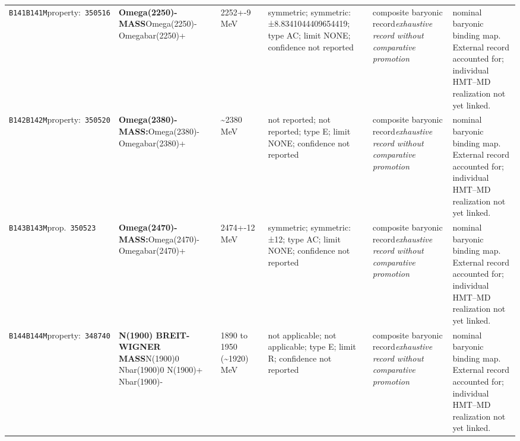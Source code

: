 \begin{landscape}
\begin{longtable}{L{1.85cm}L{4.45cm}L{2.35cm}L{4.05cm}L{3.35cm}L{7.15cm}}
\texttt{B141}\newline \texttt{B141M}\newline property:\ \texttt{350516} & \textbf{Omega(2250)- MASS}\newline Omega(2250)- \textbar{}\allowbreak{} Omegabar(2250)+ & 2252+-9\,MeV & symmetric; symmetric: ±8.8341044409654419; type AC; limit NONE; confidence not reported & composite baryonic record\newline \emph{exhaustive record without comparative promotion} & nominal baryonic binding map. External record accounted for; individual HMT--MD realization not yet linked. \\
\texttt{B142}\newline \texttt{B142M}\newline property:\ \texttt{350520} & \textbf{Omega(2380)- MASS:}\newline Omega(2380)- \textbar{}\allowbreak{} Omegabar(2380)+ & \textasciitilde{}2380\,MeV & not reported; not reported; type E; limit NONE; confidence not reported & composite baryonic record\newline \emph{exhaustive record without comparative promotion} & nominal baryonic binding map. External record accounted for; individual HMT--MD realization not yet linked. \\
\texttt{B143}\newline \texttt{B143M}\newline prop.\ \texttt{350523} & \textbf{Omega(2470)- MASS:}\newline Omega(2470)- \textbar{}\allowbreak{} Omegabar(2470)+ & 2474+-12\,MeV & symmetric; symmetric: ±12; type AC; limit NONE; confidence not reported & composite baryonic record\newline \emph{exhaustive record without comparative promotion} & nominal baryonic binding map. External record accounted for; individual HMT--MD realization not yet linked. \\
\texttt{B144}\newline \texttt{B144M}\newline property:\ \texttt{348740} & \textbf{N(1900) BREIT-WIGNER MASS}\newline N(1900)0 \textbar{}\allowbreak{} Nbar(1900)0 \textbar{}\allowbreak{} N(1900)+ \textbar{}\allowbreak{} Nbar(1900)- & 1890 to 1950 (\textasciitilde{}1920)\,MeV & not applicable; not applicable; type E; limit R; confidence not reported & composite baryonic record\newline \emph{exhaustive record without comparative promotion} & nominal baryonic binding map. External record accounted for; individual HMT--MD realization not yet linked. \\

\end{longtable}
\end{landscape}
